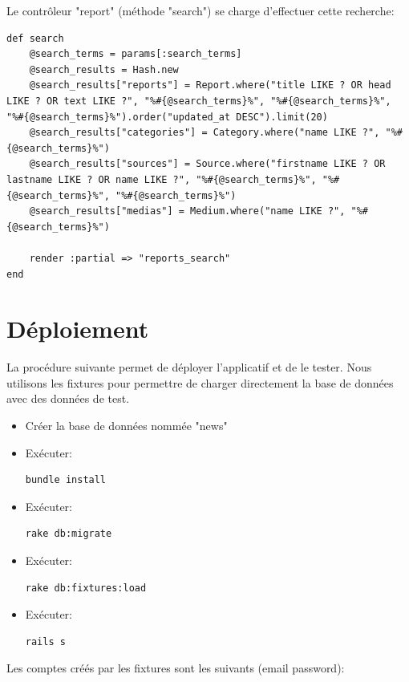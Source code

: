 \documentclass{article}
\begin{document}
Le contrôleur "report" (méthode "search") se charge d'effectuer cette recherche:

\begin{lstlisting}
def search
	@search_terms = params[:search_terms]
	@search_results = Hash.new
	@search_results["reports"] = Report.where("title LIKE ? OR head LIKE ? OR text LIKE ?", "%#{@search_terms}%", "%#{@search_terms}%", "%#{@search_terms}%").order("updated_at DESC").limit(20)
	@search_results["categories"] = Category.where("name LIKE ?", "%#{@search_terms}%")
	@search_results["sources"] = Source.where("firstname LIKE ? OR lastname LIKE ? OR name LIKE ?", "%#{@search_terms}%", "%#{@search_terms}%", "%#{@search_terms}%")
	@search_results["medias"] = Medium.where("name LIKE ?", "%#{@search_terms}%")
	
	render :partial => "reports_search"
end
\end{lstlisting}

\newpage
\section{Déploiement}

La procédure suivante permet de déployer l'applicatif et de le tester. Nous utilisons les fixtures pour permettre de charger directement la base de données avec des données de test.

\begin{itemize}
\item Créer la base de données nommée "news"
\item Exécuter: \begin{verbatim}bundle install\end{verbatim}
\item Exécuter: \begin{verbatim}rake db:migrate\end{verbatim}
\item Exécuter: \begin{verbatim}rake db:fixtures:load\end{verbatim}
\item Exécuter: \begin{verbatim}rails s\end{verbatim}
\end{itemize}

\par\null\par

Les comptes créés par les fixtures sont les suivants (email password):
\end{document}
